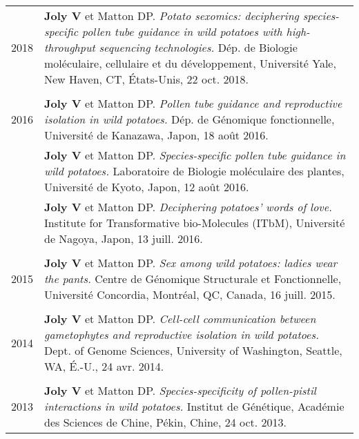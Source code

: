 \documentclass[letterpaper,12pt]{article}
\begin{document}
\begin{tabularx}{\textwidth}{@{}r|X@{}}

2018
& \textbf{Joly V} et Matton DP.
  \emph{Potato sexomics: deciphering species-specific pollen tube guidance in
  wild potatoes with high-throughput sequencing technologies.}
  Dép. de Biologie moléculaire, cellulaire et du développement,
  Université Yale, New Haven, CT, États-Unis,
  22 oct. 2018.
  \\

\multicolumn{2}{c}{} \\

2016
& \textbf{Joly V} et Matton DP.
  \emph{Pollen tube guidance and reproductive isolation in wild potatoes.}
  Dép. de Génomique fonctionnelle,
  Université de Kanazawa, Japon,
  18 août 2016.
  \vspace{1.5mm}
  \\

& \textbf{Joly V} et Matton DP.
  \emph{Species-specific pollen tube guidance in wild potatoes.}
  Laboratoire de Biologie moléculaire des plantes,
  Université de Kyoto, Japon,
  12 août 2016.
  \vspace{1.5mm}
  \\

& \textbf{Joly V} et Matton DP.
  \emph{Deciphering potatoes’ words of love.}
  Institute for Transformative bio-Molecules (ITbM),
  Université de Nagoya, Japon,
  13 juill. 2016.
  \\

\multicolumn{2}{c}{} \\

2015
& \textbf{Joly V} et Matton DP.
  \emph{Sex among wild potatoes: ladies wear the pants.}
  Centre de Génomique Structurale et Fonctionnelle, Université Concordia,
  Montréal, QC, Canada,
  16 juill. 2015.
  \\

\multicolumn{2}{c}{} \\

2014
& \textbf{Joly V} et Matton DP.
  \emph{Cell-cell communication between gametophytes and reproductive
  isolation in wild potatoes.}
  Dept. of Genome Sciences, University of Washington, Seattle, WA, É.-U.,
  24 avr. 2014.
  \\

\multicolumn{2}{c}{} \\

2013
& \textbf{Joly V} et Matton DP.
  \emph{Species-specificity of pollen-pistil interactions in wild potatoes.}
  Institut de Génétique, Académie des Sciences de Chine, Pékin, Chine,
  24 oct. 2013.
  \\

\end{tabularx}
\end{document}
